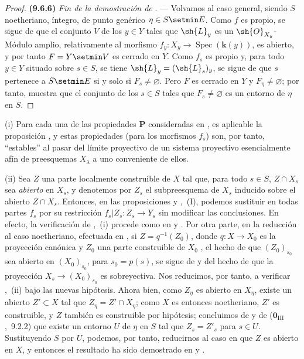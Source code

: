 \begin{proof}
\label{IV.9.6.6}%
\textbf{(9.6.6)} \emph{Fin de la demostración de} . ---
Volvamos al caso general, siendo $S$ noetheriano, íntegro, de punto genérico $\eta\in S\setmin E$.
Como $f$ es propio, se sigue de  que el conjunto $V$ de los $y\in Y$ tales que $\sh{L}_y$ es un $\sh{O}_{X_y}$-Módulo amplio, relativamente al morfismo $f_y:X_y\to\operatorname{Spec}(\boldsymbol{k}(y))$, es abierto, y por tanto $F=Y\setmin V$ es cerrado en $Y$.
Como $f_s$ es propio y, para todo $y\in Y$ situado sobre $s\in S$, se tiene
$\sh{L}_y=(\sh{L}_s)_y$, se sigue de  que $s$ pertenece a
$S\setmin E$ si y solo si $F_s\neq\varnothing$.
Pero $F$ es cerrado en $Y$ y $F_\eta\neq\varnothing$; por tanto,  muestra
que el conjunto de los $s\in S$ tales que $F_s\neq\varnothing$ es un entorno de
$\eta$ en $S$.
\end{proof}

\begin{remarks}[9.6.7]
\label{IV.9.6.7}
(i) Para cada una de las propiedades $\boldsymbol{P}$ consideradas en , es aplicable la proposición , y estas propiedades (para los morfismos $f_s$) son, por tanto, ``estables'' al pasar del límite proyectivo de un sistema proyectivo esencialmente afín  de preesquemas $X_\lambda$ a uno conveniente de ellos.

(ii) Sea $Z$ una parte localmente construible de $X$ tal que, para todo $s\in S$, $Z\cap X_s$ sea \emph{abierto} en $X_s$, y denotemos por $Z_s$ el subpreesquema de $X_s$ inducido sobre el abierto $Z\cap X_s$.
Entonces, en las proposiciones  y ,~(I), podemos sustituir en todas partes $f_s$ por su restricción $f_s|Z_s:Z_s\to Y_s$ sin modificar las conclusiones.
En efecto, la verificación de ,~(i) procede como en  y .
Por otra parte, en la reducción al caso noetheriano, efectuada en , si $Z=q^{-1}(Z_0)$, donde $q:X\to X_0$ es la proyección canónica y $Z_0$ una parte construible de $X_0$ , el hecho de que $(Z_0)_{s_0}$ sea abierto en $(X_0)_{s_0}$, para $s_0=p(s)$, se sigue de  y del hecho de que la proyección $X_s\to(X_0)_{s_0}$ es sobreyectiva.
Nos reducimos, por tanto, a verificar ,~(ii) bajo las nuevas hipótesis.
Ahora bien, como $Z_\eta$ es abierto en $X_\eta$, existe un abierto $Z'\subset X$ tal que $Z_\eta=Z'\cap X_\eta$; como $X$ es entonces noetheriano, $Z'$ es construible, y $Z$ también es construible por hipótesis; concluimos de  y de ($\mathbf{0}_{\mathrm{III}}$,~9.2.2) que existe un entorno $U$ de $\eta$ en $S$ tal que $Z_s=Z'_s$ para $s\in U$.
Sustituyendo $S$ por $U$, podemos, por tanto, reducirnos al caso en que $Z$ es abierto en $X$, y entonces el resultado ha sido demostrado en  y .
\end{remarks}

